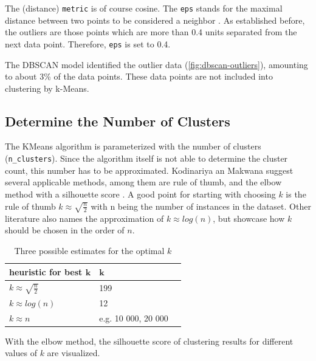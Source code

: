 The (distance) \lstinline|metric| is of course cosine. The \lstinline|eps| stands for the maximal distance between two points to be considered a neighbor \cite{SklearnClusterDBSCAN}. As established before, the outliers are those points which are more than 0.4 units separated from the next data point. Therefore, \lstinline|eps| is set to 0.4. 

The \ac{DBSCAN} model identified the outlier data (\ref{fig:dbscan-outliers}), amounting to about 3\% of the data points. These data points are not included into clustering by k-Means.

\subsection{Determine the Number of Clusters}
The KMeans algorithm is parameterized with the number of clusters (\lstinline|n_clusters|). Since the algorithm itself is not able to determine the cluster count, this number has to be approximated.
Kodinariya an Makwana suggest several applicable methods, among them are rule of thumb, and the elbow method with a silhouette score \cite{kodinariyaReviewDeterminingCluster2013}.
A good point for starting with choosing $k$ is the rule of thumb $k \approx \sqrt{\frac{n}{2}}$ with n being the number of instances in the dataset. Other literature also names the approximation of $k \approx log(n)$, but \cite[p.~1749]{maierOptimalConstructionKnearest2009} showcase how $k$ should be chosen in the order of $n$. 

\begin{table}[!h]
	\centering
	\caption{Three possible estimates for the optimal $k$}
	\begin{tabular}{lll}
		\toprule
		\textbf{heuristic for best }$\mathbf{k}$                         & $\mathbf{k}$ &  \\
		\midrule
		$k \approx \sqrt{\frac{n}{2}}$ &  199 &  \\
		\midrule
		$k \approx log(n)$             & 12   &  \\
		\midrule
		$k \approx n$                  &  e.g. 10 000, 20 000& \\
		\bottomrule
		
	\end{tabular}

\label{table:heuristic-k}
\end{table}

With the elbow method, the silhouette score of clustering results for different values of $k$ are visualized. 

